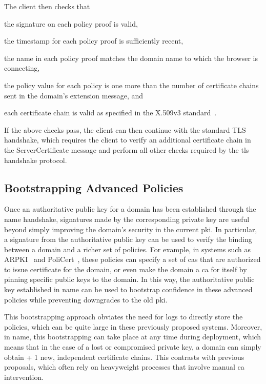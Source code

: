 The client then checks that
\begin{inparaenum}
\item the signature on each policy proof is valid,
\item the timestamp for each policy proof is sufficiently recent,
\item the name in each policy proof matches the domain name to which 
      the browser is connecting,
\item the policy value for each policy is one more than the number of
  certificate chains sent in the domain's extension message, and
\item each certificate chain is valid as specified in the X.509v3
  standard~\cite{rfc5280}.
\end{inparaenum}
If the above checks pass, the client can then continue with the standard TLS
handshake, which requires the client to verify an additional certificate chain
in the ServerCertificate message and perform all other checks required by the
\ac{tls} handshake protocol.


\subsection{Bootstrapping Advanced Policies}
\label{sec:design:bootstrapping}

Once an authoritative public key for a domain has been established through the
\ac{name} handshake, signatures made by the corresponding private key are useful 
beyond simply improving the domain's security in the current \ac{pki}.
In particular, a signature from the authoritative public key can be
used to verify the binding between a domain and a richer set of policies. For
example, in systems such as ARPKI~\cite{basin2014arpki} and
PoliCert~\cite{szalachowski2014policert}, these policies can specify a set of
\acp{ca} that are authorized to issue certificate for the domain, or even make
the domain a \ac{ca} for itself by pinning specific public keys to the domain.
In this way, the authoritative public key established in \ac{name} can be used
to bootstrap confidence in these advanced policies while preventing downgrades
to the old \ac{pki}.

This bootstrapping approach obviates the need for logs to directly store the
policies, which can be quite large in these previously proposed systems.
Moreover, in \ac{name}, this bootstrapping can take place at any time during
deployment, which means that in the case of a lost or compromised private key,
a domain can simply obtain \policy + 1 new, independent certificate chains.
This contrasts with previous proposals, which often rely on heavyweight
processes that involve manual \ac{ca} intervention.


